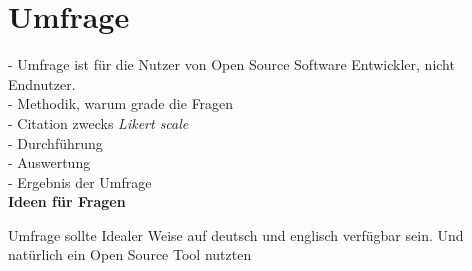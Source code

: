 \chapter{Umfrage}



- Umfrage ist für die Nutzer von Open Source Software Entwickler, nicht Endnutzer. \\
- Methodik, warum grade die Fragen \\
- Citation zwecks \textit{Likert scale} \\
- Durchführung \\
- Auswertung \\
- Ergebnis der Umfrage \\

{\huge\textbf{Ideen für Fragen}}

Umfrage sollte Idealer Weise auf deutsch und englisch verfügbar sein.
Und natürlich ein Open Source Tool nutzten

